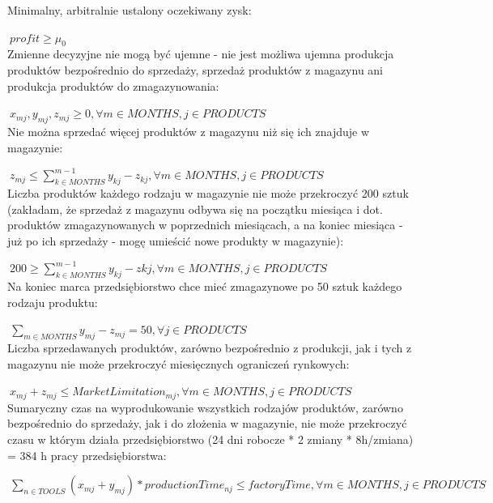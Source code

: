 \documentclass[11pt]{article} %
\begin{document}
Minimalny, arbitralnie ustalony oczekiwany zysk:

$\ profit \geqslant \mu_0$
\leavevmode \\

Zmienne decyzyjne nie mogą być ujemne - nie jest możliwa ujemna produkcja produktów bezpośrednio do sprzedaży, sprzedaż produktów z magazynu ani produkcja produktów do zmagazynowania:

$\ x_{mj}, y_{mj}, z_{mj} \geqslant 0, \forall m \in MONTHS, j \in PRODUCTS $
\leavevmode \\

Nie można sprzedać więcej produktów z magazynu niż się ich znajduje w magazynie:

$\ z_{mj} \leqslant \sum_{k \in MONTHS} ^ {m-1} y_{kj} - z_{kj}, \forall m \in MONTHS, j \in PRODUCTS $
\leavevmode \\

Liczba produktów każdego rodzaju w magazynie nie może przekroczyć 200 sztuk (zakładam, że sprzedaż z magazynu odbywa się na początku miesiąca i dot. produktów zmagazynowanych w poprzednich miesiącach, a na koniec miesiąca - już po ich sprzedaży - mogę umieścić nowe produkty w magazynie):

$\ 200 \geqslant \sum_{k \in MONTHS} ^ {m-1} y_{kj} - z{kj}, \forall m \in MONTHS, j \in PRODUCTS $
\leavevmode \\

Na koniec marca przedsiębiorstwo chce mieć zmagazynowe po 50 sztuk każdego rodzaju produktu:

$\ \sum_{m \in MONTHS} y_{mj} - z_{mj} = 50, \forall  j \in PRODUCTS $
\leavevmode \\

Liczba sprzedawanych produktów, zarówno bezpośrednio z produkcji, jak i tych z magazynu nie może przekroczyć miesięcznych ograniczeń rynkowych:

$\ x_{mj} + z_{mj} \leqslant MarketLimitation_{mj}, \forall m \in MONTHS, j \in PRODUCTS $
\leavevmode \\

Sumaryczny czas na wyprodukowanie wszystkich rodzajów produktów, zarówno bezpośrednio do sprzedaży, jak i do złożenia w magazynie, nie może przekroczyć czasu w którym działa przedsiębiorstwo (24 dni robocze * 2 zmiany * 8h/zmiana) = 384 h pracy przedsiębiorstwa:

$\ \sum_{n \in TOOLS} (x_{mj} + y_{mj})*productionTime_{nj} \leqslant factoryTime, 
 \forall m \in MONTHS, j \in PRODUCTS $
\leavevmode \\
\end{document}
